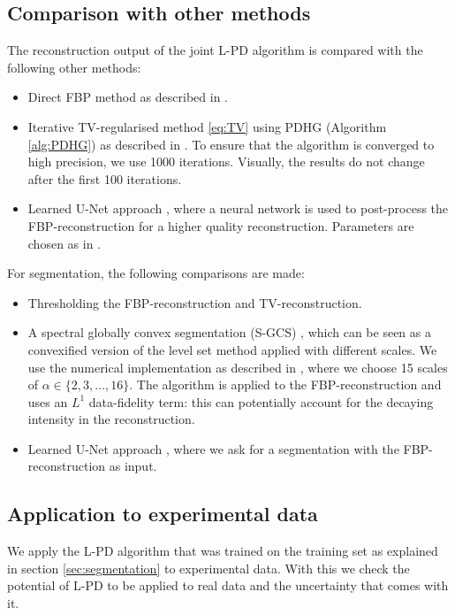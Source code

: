 \documentclass[journal]{IEEEtran}
\newcommand{\hl}[1]{\cbcolor{red}\begin{changebar}{#1}\end{changebar}}
\begin{document}
\subsection{Comparison with other methods}\label{sec:comparison}
\hl{The reconstruction output of the joint L-PD algorithm is compared with the following other methods:
\begin{itemize}
\item Direct FBP method as described in \cite{Willemink2010}.
\item Iterative TV-regularised method \eqref{eq:TV} using PDHG (Algorithm \ref{alg:PDHG}) as described in \cite{Boink2018}. To ensure that the algorithm is converged to high precision, we use 1000 iterations. Visually, the results do not change after the first 100 iterations.
\item Learned U-Net approach \cite{Jin2017}, where a neural network is used to post-process the FBP-reconstruction for a higher quality reconstruction. Parameters are chosen as in \cite{Jin2017}. 
\end{itemize}
For segmentation, the following comparisons are made:
\begin{itemize}
\item Thresholding the FBP-reconstruction and TV-reconstruction.
\item A spectral globally convex segmentation (S-GCS) \cite{Zeune2017}, which can be seen as a convexified version of the level set method \cite{Goldstein2010} applied with different scales. We use the numerical implementation as described in \cite{Zeune2017}, where we choose 15 scales of $\alpha\in\{2,3,\dots,16\}$. 
The algorithm is applied to the FBP-reconstruction and uses an $L^1$ data-fidelity term: this can potentially account for the decaying intensity in the reconstruction.
\item Learned U-Net approach \cite{Ronneberger2015}, where we ask for a segmentation with the FBP-reconstruction as input.
\end{itemize}
}

\subsection{Application to experimental data}\label{sec:exp_phantom}
\hl{We apply the L-PD algorithm that was trained on the training set as explained in section \ref{sec:segmentation} to experimental data. With this we check the potential of L-PD to be applied to real data and the uncertainty that comes with it.}
\end{document}
